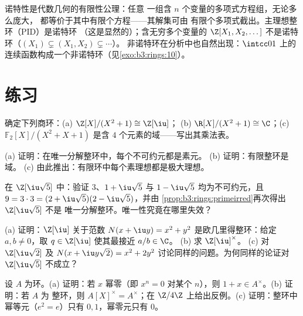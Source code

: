 \begin{remark}\label{rem:b3:rings:noethmeaning}
诺特性是代数几何的有限性公理：任意
一组含 $n$ 个变量的多项式方程组，无论多么庞大，
都等价于其中有限个方程——其解集可由
有限个多项式截出。主理想整环（PID）是诺特环
（这是显然的）；含无穷多个变量的 $\Z[X_1, X_2, \dots]$
不是诺特环（$(X_1) \subsetneq (X_1, X_2) \subsetneq \cdots$）。
非诺特环在分析中也自然出现：$\intcc01$ 上的
连续函数构成一个非诺特环（见\cref{exo:b3:rings:10}）。
\end{remark}

\section{练习}

\begin{exercise}[$\star$]\label{exo:b3:rings:1}
确定下列商环：(a) $\Z[X]/(X^2 + 1) \cong \Z[\iu]$；
(b) $\R[X]/(X^2+1) \cong \C$；(c) $\mathbb F_2[X]/(X^2 + X + 1)$
是含 $4$ 个元素的域——写出其乘法表。
\end{exercise}

\begin{exercise}[$\star$]\label{exo:b3:rings:2}
(a) 证明：在唯一分解整环中，每个不可约元都是素元。
(b) 证明：有限整环是域。
(c) 由此推出：有限环中每个素理想都是极大理想。
\end{exercise}

\begin{exercise}[$\star$]\label{exo:b3:rings:3}
在 $\Z[\iu\sqrt5]$ 中：验证 $3$、$1 + \iu\sqrt5$ 与 $1 -
\iu\sqrt5$ 均为不可约元，且 $9 = 3\cdot 3 = (2 +
\iu\sqrt5)(2 - \iu\sqrt5)$，并由
\cref{prop:b3:rings:primeirred}再次得出 $\Z[\iu\sqrt5]$ 不是
唯一分解整环。唯一性究竟在哪里失效？
\end{exercise}

\begin{exercise}[$\star\star$]\label{exo:b3:rings:4}
(a) 证明：$\Z[\iu]$ 关于范数 $N(x + \iu y) =
x^2 + y^2$ 是欧几里得整环：给定 $a, b \neq 0$，取 $q \in \Z[\iu]$ 使其最接近
$a/b \in \C$。
(b) 求 $\Z[\iu]^\times$。
(c) 对 $\Z[\iu\sqrt2]$ 及 $N(x + \iu y\sqrt2) =
x^2 + 2y^2$ 讨论同样的问题。为何同样的论证对
$\Z[\iu\sqrt5]$ 不成立？
\end{exercise}

\begin{exercise}[$\star\star$]\label{exo:b3:rings:5}
设 $A$ 为环。(a) 证明：若 $x$ 幂零（即 $x^n = 0$
对某个 $n$），则 $1 + x \in A^\times$。(b) 证明：若 $A$ 为
整环，则 $A[X]^\times = A^\times$；在
$\Z/4\Z$ 上给出反例。(c) 证明：整环中幂等元（$e^2 = e$）只有
$0, 1$，幂零元只有 $0$。
\end{exercise}

